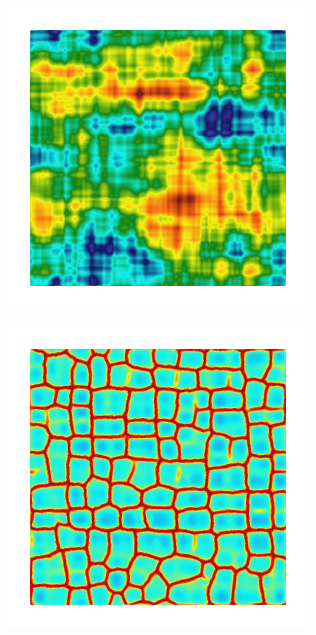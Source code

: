 \begin{figure}[!htb]
\begin{subfigure}[b]{0.15\textwidth}
    \end{subfigure}
    \begin{subfigure}[b]{0.15\textwidth}
        \includegraphics[width=\textwidth]{past/figures/psic_exp_cartesian_20_20_rho_0_seed_b.png}
    \end{subfigure}
    \begin{subfigure}[b]{0.15\textwidth}
        \includegraphics[width=\textwidth]{past/figures/d_exp_cartesian_20_20_rho_0_seed_b.png}
    \end{subfigure}
\end{figure}
